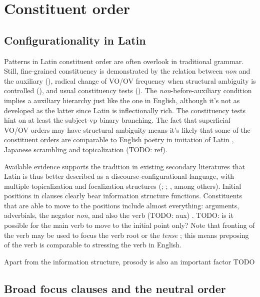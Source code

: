\documentclass[a4paper, oneside, 12pt]{report}
\newcommand*{\citesec}[1]{\S~{#1}}
\newcommand*{\citepage}[1]{p.~{#1}}
\newcommand{\form}[1]{\emph{#1}}
\begin{document}
\chapter{Constituent order}\label{chap:order}

\section{Configurationality in Latin}

Patterns in Latin constituent order are often overlook in traditional grammar.
Still, fine-grained constituency is demonstrated by 
the relation between \form{non} and the auxiliary 
(),
radical change of VO/OV frequency when structural ambiguity is controlled
(),
and usual constituency tests 
(\citealt[\citesec{1.6}]{danckaert2017development}).
The \form{non}-before-auxiliary condition implies 
a auxiliary hierarchy just like the one in English, 
although it's not as developed as the latter 
since Latin is inflectionally rich.
The constituency tests hint on 
at least the subject-\acs{vp} binary branching.
The fact that superficial VO/OV orders may have structural ambiguity 
means it's likely that some of the constituent orders 
are comparable to
English poetry in imitation of Latin \citep[\citesec{600}]{allen1903allen},
Japanese scrambling and topicalization (TODO: ref).

Available evidence supports the tradition in existing secondary literatures that
Latin is thus better described as a discourse-configurational language,
with multiple topicalization and focalization structures
(\citealt[\citepage{189}]{oniga2014latin}; 
\citealt[\citepage{77}]{danckaert2017development}; 
\citealt{devine2006latin}, among others).
Initial positions in clauses clearly bear information structure functions. 
Constituents that are able to move to the positions 
include almost everything: 
arguments, adverbials, the negator \form{non}, 
and also the verb (TODO: aux) 
\citep[\citesec{598}]{allen1903allen}. 
TODO: is it possible for the main verb to move to the initial point only?
Note that fronting of the verb may be used 
to focus the verb root or the \emph{tense}
\citep[\citepage{397}]{allen1903allen};
this means preposing of the verb is comparable to 
stressing the verb in English.

Apart from the information structure, 
prosody is also an important factor TODO

\section{Broad focus clauses and the neutral order}
\end{document}
